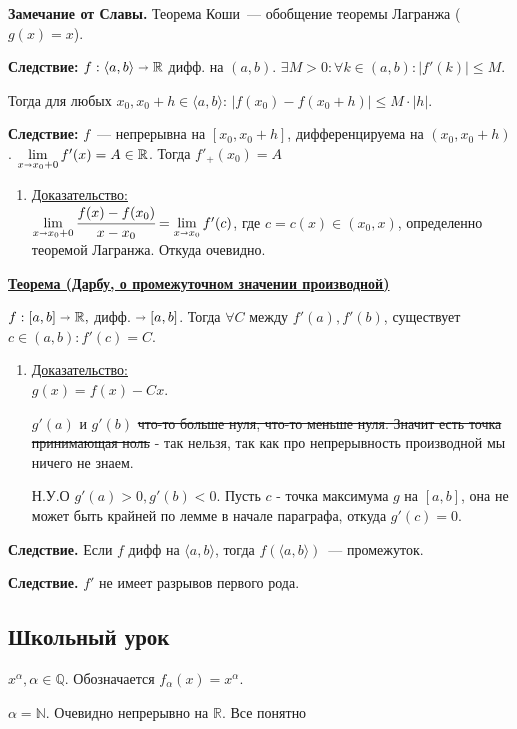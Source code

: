 \documentclass{article}
\newcommand{\thmm}[1]{\underline{\textbf{#1}}}
\newcommand{\prooff}[1]{{\underline{Доказательство:}} \\ }
\begin{document}
\textbf{Замечание от Славы.} Теорема Коши~--- обобщение теоремы Лагранжа ($g(x) = x$).

\textbf{Следствие:} $f:\langle a,b\rangle \shortrightarrow \mathbb{R}$ дифф. на $(a,b)$. $\exists M>0: \forall k \in (a,b): |f'(k)| \leq M$.

Тогда для любых $x_0, x_0 + h \in \langle a,b \rangle$: $|f(x_0)-f(x_0+h)|\leq M \cdot |h|$.

\textbf{Следствие:} $f$~--- непрерывна на $[x_0, x_0+h]$, дифференцируема на $(x_0, x_0+h)$. $\lim\limits_{x\shortrightarrow x_0  +0} f'(x) = A \in \mathbb{R}$.  Тогда $f'_{+}(x_0) = A$
\begin{enumerate}
    \item[] \prooff{}
    $\lim\limits_{x \shortrightarrow x_0 + 0} \cfrac{f(x)-f(x_0)}{x-x_0} = \lim\limits_{x\shortrightarrow x_0} f'(c)$, где $c = c(x) \in (x_0,x)$, определенно теоремой Лагранжа.
    Откуда очевидно.
\end{enumerate}

\thmm{Теорема (Дарбу, о промежуточном значении производной)}

$f: [a,b] \shortrightarrow \mathbb{R},$ дифф. $\shortrightarrow [a,b]$. Тогда $\forall C$ между $f'(a),f'(b)$, существует $c \in (a,b): f'(c) = C$.
\begin{enumerate}
    \item[] \prooff{}
$g(x) = f(x) - Cx$.

$g'(a) $ и $g'(b)$ \sout{что-то больше нуля, что-то меньше нуля. Значит есть точка принимающая ноль} - так нельзя, так как про непрерывность производной мы ничего не знаем.

Н.У.О $g'(a)>0, g'(b)<0$. Пусть $ c$ - точка максимума $g$ на $[a,b]$, она не может быть крайней по лемме в начале параграфа, откуда $g'(c) = 0$.
\end{enumerate}

\textbf{Следствие.} Если $f$ дифф на $\langle a,b \rangle $, тогда $f(\langle a,b \rangle)$~--- промежуток.

\textbf{Следствие.} $f' $ не имеет разрывов первого рода.
\pagebreak

\subsection{Школьный урок}

$x^\alpha, \alpha \in \mathbb{Q}$. Обозначается $f_{\alpha}(x) =x^\alpha$.

$\alpha = \mathbb{N}$.  Очевидно непрерывно на $\mathbb{R}$. Все понятно
\end{document}
